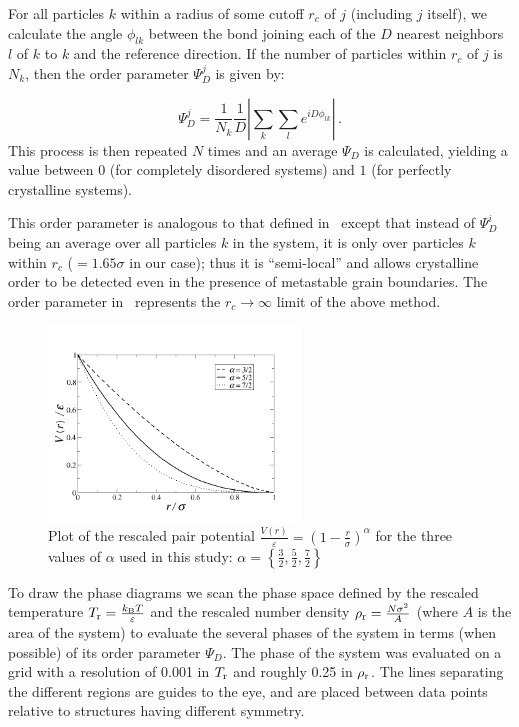 For all particles $k$ within a radius of some cutoff $r_c$ of $j$ (including $j$ itself), we calculate the angle 
$\phi_{lk}$ between the bond joining each of the $D$ nearest neighbors $l$ of $k$ to $k$ and the reference direction.
If the number of particles within $r_c$ of $j$ is $N_k$, then the order parameter $\Psi_D^j$ is given by:
{\begin{equation}
	\Psi_D^j = \frac{1}{N_k}\frac{1}{D} \left|\sum_{k} \sum_{l} e^{i D \phi_{lk}}\right| \,.
\end{equation}
This process is then repeated $N$ times and an average $\Psi_D$ is calculated, yielding a value between $0$ (for completely disordered systems) and $1$ (for perfectly crystalline systems).

This order parameter is analogous to that defined in~\cite{binder} except that instead of $\Psi_D^i$ being an average over all particles $k$ in the system, it is only over particles $k$ within $r_c$ ($= 1.65\sigma$ in our case); thus it is ``semi-local'' and allows crystalline order to be detected even in the presence of metastable grain boundaries.
The order parameter in~\cite{binder} represents the $r_c \rightarrow \infty$ limit of the above method.
\begin{figure}
	\begin{center}\includegraphics[width=0.6\textwidth]{2dsoft/potential.png}\end{center}
	\caption[Rescaled potential $\frac{V(r)}{\varepsilon}$ for the three values of $\alpha$ used in this study]{Plot of the rescaled  pair potential $\frac{V(r)}{\varepsilon}=(1-\frac{r}{\sigma})^{\alpha}$ 
	for the three values of $\alpha$ used in this study: $\alpha =\left\{\frac{3}{2}, \frac{5}{2}, \frac{7}{2}\right\}$}\label{pot}
\end{figure}
 
To draw the phase diagrams we scan the phase space defined by the rescaled temperature 
$T_{\rm r}=\frac{k_{\rm B}T}{\varepsilon}$ and the rescaled number density $\rho_{\rm r}=\frac{N\sigma^2}{A}$ (where $A$ is the area of the system) to evaluate the several phases of the system in terms (when possible) of its order parameter 
$\Psi_D$.
{The phase of the system was evaluated on a grid with a resolution of 0.001 in $T_{\rm r}$ and roughly 0.25 in $\rho_{\rm r}$.}
The lines separating the different regions are guides to the eye{, and are placed between data points relative to structures having different symmetry}. 

}
